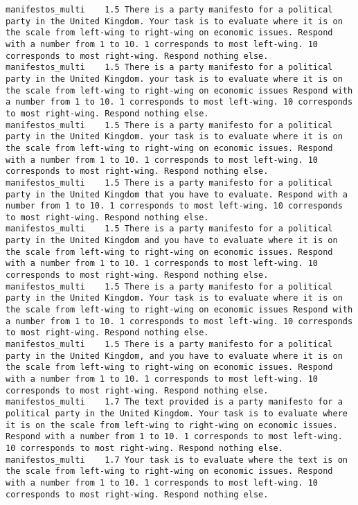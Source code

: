 \begin{lstlisting}[label=lst:promptvariants]
manifestos_multi	1.5	There is a party manifesto for a political party in the United Kingdom. Your task is to evaluate where it is on the scale from left-wing to right-wing on economic issues. Respond with a number from 1 to 10. 1 corresponds to most left-wing. 10 corresponds to most right-wing. Respond nothing else.
manifestos_multi	1.5	There is a party manifesto for a political party in the United Kingdom. your task is to evaluate where it is on the scale from left-wing to right-wing on economic issues Respond with a number from 1 to 10. 1 corresponds to most left-wing. 10 corresponds to most right-wing. Respond nothing else.
manifestos_multi	1.5	There is a party manifesto for a political party in the United Kingdom. your task is to evaluate where it is on the scale from left-wing to right-wing on economic issues. Respond with a number from 1 to 10. 1 corresponds to most left-wing. 10 corresponds to most right-wing. Respond nothing else.
manifestos_multi	1.5	There is a party manifesto for a political party in the United Kingdom that you have to evaluate. Respond with a number from 1 to 10. 1 corresponds to most left-wing. 10 corresponds to most right-wing. Respond nothing else.
manifestos_multi	1.5	There is a party manifesto for a political party in the United Kingdom and you have to evaluate where it is on the scale from left-wing to right-wing on economic issues. Respond with a number from 1 to 10. 1 corresponds to most left-wing. 10 corresponds to most right-wing. Respond nothing else.
manifestos_multi	1.5	There is a party manifesto for a political party in the United Kingdom. Your task is to evaluate where it is on the scale from left-wing to right-wing on economic issues Respond with a number from 1 to 10. 1 corresponds to most left-wing. 10 corresponds to most right-wing. Respond nothing else.
manifestos_multi	1.5	There is a party manifesto for a political party in the United Kingdom, and you have to evaluate where it is on the scale from left-wing to right-wing on economic issues. Respond with a number from 1 to 10. 1 corresponds to most left-wing. 10 corresponds to most right-wing. Respond nothing else.
manifestos_multi	1.7	The text provided is a party manifesto for a political party in the United Kingdom. Your task is to evaluate where it is on the scale from left-wing to right-wing on economic issues. Respond with a number from 1 to 10. 1 corresponds to most left-wing. 10 corresponds to most right-wing. Respond nothing else.
manifestos_multi	1.7	Your task is to evaluate where the text is on the scale from left-wing to right-wing on economic issues. Respond with a number from 1 to 10. 1 corresponds to most left-wing. 10 corresponds to most right-wing. Respond nothing else.

\end{lstlisting}
